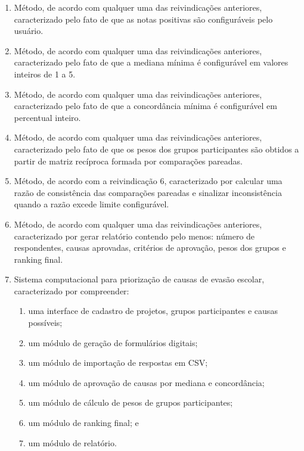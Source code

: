 \begin{enumerate}
  \item Método, de acordo com qualquer uma das reivindicações anteriores, caracterizado pelo fato de que as notas positivas são configuráveis pelo usuário.

  \item Método, de acordo com qualquer uma das reivindicações anteriores, caracterizado pelo fato de que a mediana mínima é configurável em valores inteiros de 1 a 5.

  \item Método, de acordo com qualquer uma das reivindicações anteriores, caracterizado pelo fato de que a concordância mínima é configurável em percentual inteiro.

  \item Método, de acordo com qualquer uma das reivindicações anteriores, caracterizado pelo fato de que os pesos dos grupos participantes são obtidos a partir de matriz recíproca formada por comparações pareadas.

  \item Método, de acordo com a reivindicação 6, caracterizado por calcular uma razão de consistência das comparações pareadas e sinalizar inconsistência quando a razão excede limite configurável.

  \item Método, de acordo com qualquer uma das reivindicações anteriores, caracterizado por gerar relatório contendo pelo menos: número de respondentes, causas aprovadas, critérios de aprovação, pesos dos grupos e ranking final.

  \item Sistema computacional para priorização de causas de evasão escolar, caracterizado por compreender:
  \begin{enumerate}[label=\alph*)]
    \item uma interface de cadastro de projetos, grupos participantes e causas possíveis;
    \item um módulo de geração de formulários digitais;
    \item um módulo de importação de respostas em CSV;
    \item um módulo de aprovação de causas por mediana e concordância;
    \item um módulo de cálculo de pesos de grupos participantes;
    \item um módulo de ranking final; e
    \item um módulo de relatório.
  \end{enumerate}


\end{enumerate}
